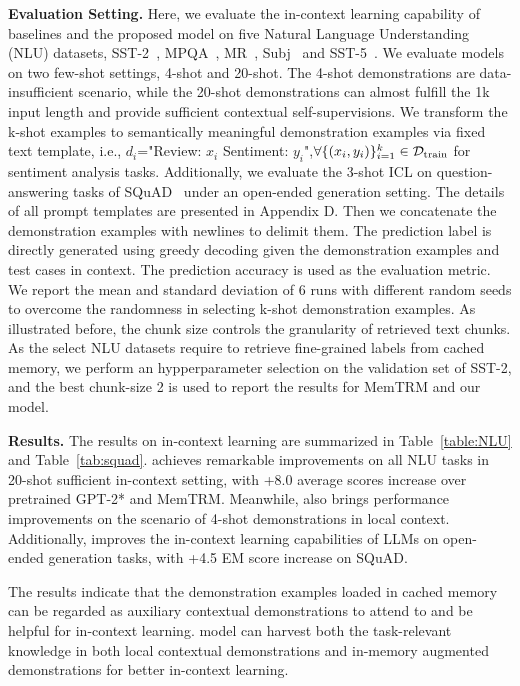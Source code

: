\textbf{Evaluation Setting.} Here, we evaluate the in-context learning capability of baselines and the proposed \our{} model on five Natural Language Understanding (NLU) datasets, SST-2~\citep{socher2013recursive}, MPQA~\citep{wiebe2005annotating}, MR~\citep{auer2007dbpedia}, Subj~\citep{subj} and SST-5~\citep{socher2013recursive}. We evaluate models on two few-shot settings, 4-shot and 20-shot. The 4-shot demonstrations are data-insufficient scenario, while the 20-shot demonstrations can almost fulfill the 1k input length and provide sufficient contextual self-supervisions. We transform the k-shot examples to semantically meaningful demonstration examples via fixed text template, i.e., $d_i$="Review: $x_i$ Sentiment: $y_i$",$\forall \{(x_i,y_i)\}_{i=1}^k\in \mathcal{D}_{\textnormal{train}} $ for sentiment analysis tasks. Additionally, we evaluate the 3-shot ICL on question-answering tasks of SQuAD~\citep{squad} under an open-ended generation setting. The details of all prompt templates are presented in Appendix D. Then we concatenate the demonstration examples with newlines to delimit them. The prediction label is directly generated using greedy decoding given the demonstration examples and test cases in context. The prediction accuracy is used as the evaluation metric. We report the mean and standard deviation of 6 runs with different random seeds to overcome the randomness in selecting k-shot demonstration examples. As illustrated before, the chunk size controls the granularity of retrieved text chunks. As the select NLU datasets require to retrieve fine-grained labels from cached memory, we perform an hypperparameter selection on the validation set of SST-2, and the best chunk-size 2 is used to report the results for MemTRM and our model.

\textbf{Results.} The results on in-context learning are summarized in Table~\ref{table:NLU} and Table~\ref{tab:squad}.
\our{} achieves remarkable improvements on all NLU tasks in 20-shot sufficient in-context setting, with +8.0 average scores increase over pretrained GPT-2* and MemTRM. Meanwhile, \our{} also brings performance improvements on the scenario of 4-shot demonstrations in local context. Additionally, \our{} improves the in-context learning capabilities of LLMs on open-ended generation tasks, with +4.5 EM score increase on SQuAD. 

The results indicate that the demonstration examples loaded in cached memory can be regarded as auxiliary contextual demonstrations to attend to and be helpful for in-context learning. 
\our{} model can harvest both the task-relevant knowledge in both local contextual demonstrations and in-memory augmented demonstrations for better in-context learning.

